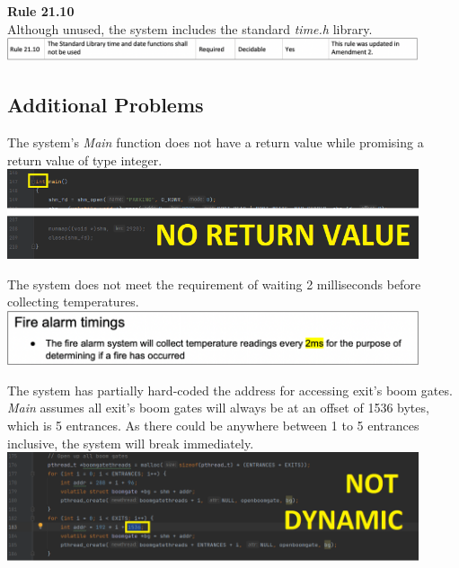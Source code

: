 \documentclass[a4paper]{article}
\begin{document}
\par \noindent \textbf{Rule 21.10} \\[1\baselineskip]
Although unused, the system includes the standard \emph{time.h} library. \\[1\baselineskip]
\includegraphics[width=12.12cm]{report-img/misra-c-13.png}

\newpage
\subsection{Additional Problems}

\par \noindent The system’s \emph{Main} function does not have a return value while promising a return value of type integer. \\[1\baselineskip]
\includegraphics[width=12.12cm]{report-img/other-problem-1.png}

\par \noindent The system does not meet the requirement of waiting 2 milliseconds before collecting temperatures. \\[1\baselineskip]
\includegraphics[width=12.12cm]{report-img/other-problem-2.png}

\par \noindent The system has partially hard-coded the address for accessing exit’s boom gates. \emph{Main} assumes all exit’s boom gates will always be at an offset of 1536 bytes, which is 5 entrances. As there could be anywhere between 1 to 5 entrances inclusive, the system will break immediately. \\[1\baselineskip]
\includegraphics[width=12.12cm]{report-img/other-problem-3.png}
\end{document}
